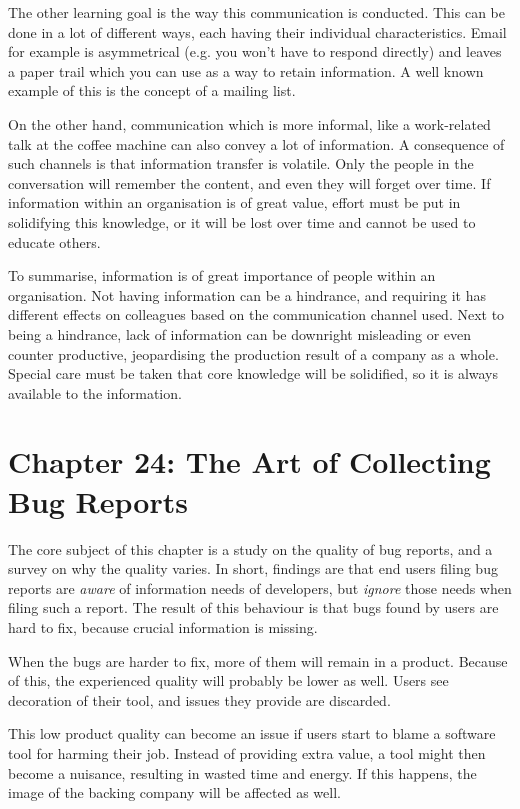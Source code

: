 \documentclass[]{uva-bachelor-thesis}
\begin{document}
The other learning goal is the way this communication is conducted.
This can be done in a lot of different ways, each having their individual characteristics. 
Email for example is asymmetrical (e.g. you won't have to respond directly) and leaves a paper trail which you can use as a way to retain information. 
A well known example of this is the concept of a mailing list. 

On the other hand, communication which is more informal, like a work-related talk at the coffee machine can also convey a lot of information. 
A consequence of such channels is that information transfer is volatile. 
Only the people in the conversation will remember the content, and even they will forget over time. 
If information within an organisation is of great value, effort must be put in solidifying this knowledge, or it will be lost over time and cannot be used to educate others. 

To summarise, information is of great importance of people within an organisation. 
Not having information can be a hindrance, and requiring it has different effects on colleagues based on the communication channel used. 
Next to being a hindrance, lack of information can be downright misleading or even counter productive, jeopardising the production result of a company as a whole.
Special care must be taken that core knowledge will be solidified, so it is always available to the information. 

\chapter{Chapter 24: The Art of Collecting Bug Reports \cite{makingsoftware}}
The core subject of this chapter is a study on the quality of bug reports, and a survey on why the quality varies.
In short, findings are that end users filing bug reports are \emph{aware} of information needs of developers, but \emph{ignore} those needs when filing such a report.
The result of this behaviour is that bugs found by users are hard to fix, because crucial information is missing. 

When the bugs are harder to fix, more of them will remain in a product. 
Because of this, the experienced quality will probably be lower as well. 
Users see decoration of their tool, and issues they provide are discarded. 

This low product quality can become an issue if users start to blame a software tool for harming their job. 
Instead of providing extra value, a tool might then become a nuisance, resulting in wasted time and energy. 
If this happens, the image of the backing company will be affected as well. 
\end{document}
